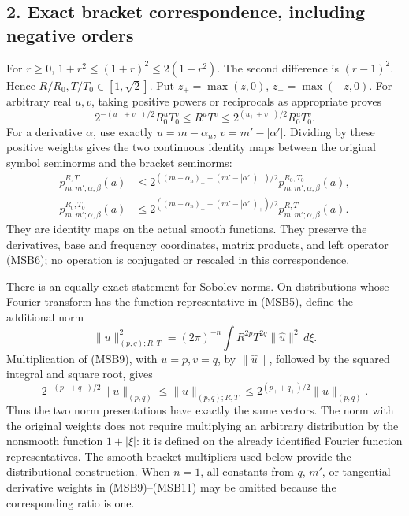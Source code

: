 \documentclass[
  11pt,
]{article}
\makeatletter
\let\ReaderOriginalAnchorStart\hyper@anchorstart
\let\ReaderOriginalAnchorEnd\hyper@anchorend
\let\ReaderPendingAliases\@empty
\def\ReaderArmAliases#1{\gdef\ReaderPendingAliases{#1}}
\def\hyper@anchorstart#1{\ReaderIfNativeAnchorTF{#1}{\ReaderPendingAliases\global\let\ReaderPendingAliases\@empty}{}\ReaderOriginalAnchorStart{#1}}
\makeatother
\begin{document}
\subsection{2. Exact bracket correspondence, including negative
orders}\label{exact-bracket-correspondence-including-negative-orders}

For \(r\geq0\), \(1+r^2\leq(1+r)^2\leq2(1+r^2)\). The second difference
is \((r-1)^2\). Hence \(R/R_0,T/T_0\in[1,\sqrt2]\). Put
\(z_+=\max(z,0)\), \(z_-=\max(-z,0)\). For arbitrary real \(u,v\),
taking positive powers or reciprocals as appropriate proves \[
 2^{-(u_-+v_-)/2}R_0^uT_0^v
 \leq R^uT^v
 \leq2^{(u_++v_+)/2}R_0^uT_0^v.
 \tag{MSB9}
\] For a derivative \(\alpha\), use exactly \(u=m-\alpha_n\),
\(v=m'-|\alpha'|\). Dividing by these positive weights gives the two
continuous identity maps between the original symbol seminorms and the
bracket seminorms: \[
 \begin{split}
 p^{R,T}_{m,m';\alpha,\beta}(a)
 &\leq2^{((m-\alpha_n)_-+(m'-|\alpha'|)_-)/2}
       p^{R_0,T_0}_{m,m';\alpha,\beta}(a),\\
 p^{R_0,T_0}_{m,m';\alpha,\beta}(a)
 &\leq2^{((m-\alpha_n)_++(m'-|\alpha'|)_+)/2}
       p^{R,T}_{m,m';\alpha,\beta}(a).
 \end{split}
 \tag{MSB10}
\] They are identity maps on the actual smooth functions. They preserve
the derivatives, base and frequency coordinates, matrix products, and
left operator (MSB6); no operation is conjugated or rescaled in this
correspondence.

There is an equally exact statement for Sobolev norms. On distributions
whose Fourier transform has the function representative in (MSB5),
define the additional norm \[
 \|u\|_{(p,q);R,T}^2=(2\pi)^{-n}\int R^{2p}T^{2q}\|\widehat u\|^2\,d\xi.
\] Multiplication of (MSB9), with \(u=p,v=q\), by \(\|\widehat u\|\),
followed by the squared integral and square root, gives \[
 2^{-(p_-+q_-)/2}\|u\|_{(p,q)}
 \leq\|u\|_{(p,q);R,T}
 \leq2^{(p_++q_+)/2}\|u\|_{(p,q)}.
 \tag{MSB11}
\] Thus the two norm presentations have exactly the same vectors. The
norm with the original weights does not require multiplying an arbitrary
distribution by the nonsmooth function \(1+|\xi|\): it is defined on the
already identified Fourier function representatives. The smooth bracket
multipliers used below provide the distributional construction. When
\(n=1\), all constants from \(q\), \(m'\), or tangential derivative
weights in (MSB9)--(MSB11) may be omitted because the corresponding
ratio is one.

\ReaderArmAliases{\ReaderOriginalAnchorStart{AN03-MSB-003}\ReaderOriginalAnchorEnd\begingroup\expandafter\def\csname @currentHref\endcsname{AN03-MSB-003}\label{AN03-MSB-003}\endgroup\ReaderOriginalAnchorStart{an03-msb-003-smooth-multiplier-symbols-with-finite-explicit-bounds}\ReaderOriginalAnchorEnd\begingroup\expandafter\def\csname @currentHref\endcsname{an03-msb-003-smooth-multiplier-symbols-with-finite-explicit-bounds}\label{an03-msb-003-smooth-multiplier-symbols-with-finite-explicit-bounds}\endgroup\ReaderOriginalAnchorStart{3-smooth-multiplier-symbols-with-finite-explicit-bounds}\ReaderOriginalAnchorEnd\begingroup\expandafter\def\csname @currentHref\endcsname{3-smooth-multiplier-symbols-with-finite-explicit-bounds}\label{3-smooth-multiplier-symbols-with-finite-explicit-bounds}\endgroup}
\end{document}
